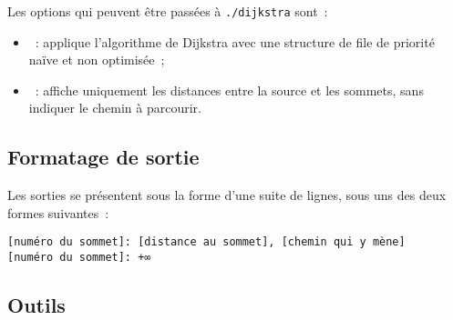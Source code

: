 \documentclass[12pt,a4paper]{article}
\begin{document}
Les options qui peuvent être passées à \texttt{./dijkstra} sont~:
\begin{itemize}
\item {}~: applique l'algorithme de Dijkstra avec une structure de file de priorité naïve et non optimisée~;
\item {}~: affiche uniquement les distances entre la source et les sommets, sans indiquer le chemin à parcourir.
\end{itemize}

\subsection{Formatage de sortie}

Les sorties se présentent sous la forme d'une suite de lignes, sous uns des deux formes suivantes~:
\begin{lstlisting}
[numéro du sommet]: [distance au sommet], [chemin qui y mène]
[numéro du sommet]: +∞
\end{lstlisting}

\subsection{Outils}
\end{document}
